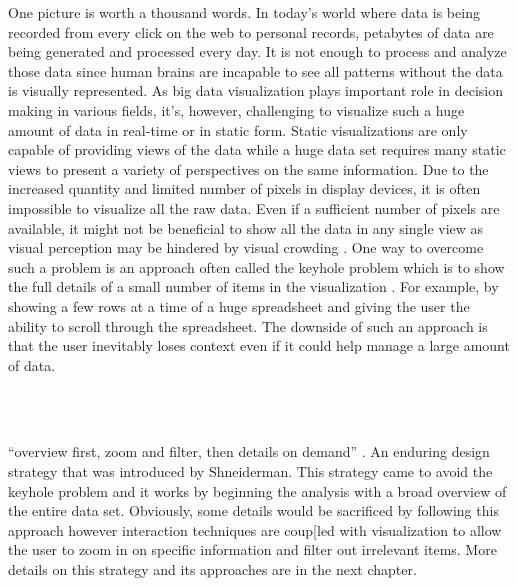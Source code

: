 One picture is worth a thousand words. In today's world where data is being recorded from every click on the web to personal records, petabytes of data are being generated and processed every day. It is not enough to process and analyze those data since human brains are incapable to see all patterns without the data is visually represented. As big data visualization plays important role in decision making in various fields, it's, however, challenging to visualize such a huge amount of data in real-time or in static form. Static visualizations are only capable of providing views of the data while a huge data set requires many static views to present a variety of perspectives on the same information. Due to the increased quantity and limited number of pixels in display devices, it is often impossible to visualize all the raw data. Even if a sufficient number of pixels are available, it might not be beneficial to show all the data in any single view as visual perception may be hindered by visual crowding \cite{wolfe2015sensation}. One way to overcome such a problem is an approach often called the keyhole problem which is to show the full details of a small number of items in the visualization \cite{salvendy2012handbook}. For example, by showing a few rows at a time of a huge spreadsheet and giving the user the ability to scroll through the spreadsheet. The downside of such an approach is that the user inevitably loses context even if it could help manage a large amount of data.

\\\

“overview first, zoom and filter, then details on demand” \cite{shneiderman2003eyes}. An enduring design strategy that was introduced by Shneiderman. This strategy came to avoid the keyhole problem and it works by beginning the analysis with a broad overview of the entire data set. Obviously, some details would be sacrificed by following this approach however interaction techniques are coup[led with visualization to allow the user to zoom in on specific information and filter out irrelevant items. More details on this strategy and its approaches are in the next chapter.

